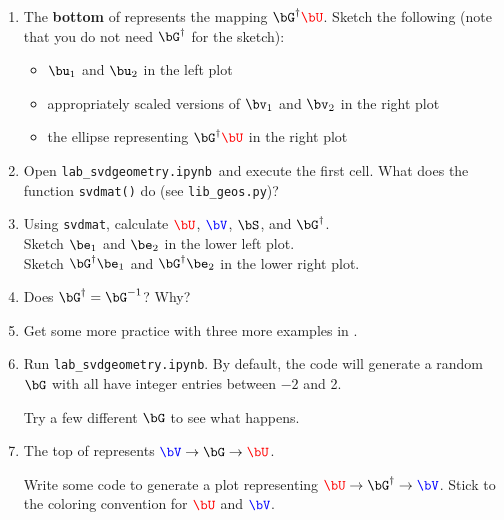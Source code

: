 \documentclass[11pt,titlepage,fleqn]{article}
\newcommand{\tfile}{{\tt lab\_svdgeometry.ipynb}}
\begin{document}
\begin{enumerate}

\item The {\bf bottom} of  represents the mapping $\bG^{\dagger}\Ucolor$. Sketch the following (note that you do not need $\bG^{\dagger}$ for the sketch):
%
\begin{itemize}
\item $\bu_1$ and $\bu_2$ in the left plot
\item appropriately scaled versions of $\bv_1$ and $\bv_2$ in the right plot
\item the ellipse representing $\bG^{\dagger}\Ucolor$ in the right plot
\end{itemize}

\item Open \tfile\ and execute the first cell. What does the function \verb+svdmat()+ do (see \verb+lib_geos.py+)?

\item Using \verb+svdmat+, calculate $\Ucolor$, $\Vcolor$, $\bS$, and $\bG^{\dagger}$. \\
Sketch $\be_1$ and $\be_2$ in the lower left plot. \\
Sketch $\bG^{\dagger}\be_1$ and $\bG^{\dagger}\be_2$ in the lower right plot.

\item Does $\bG^{\dagger} = \bG^{-1}$? Why?

\item Get some more practice with three more examples in .

\item Run \tfile. By default, the code will generate a random $\bG$ with all have integer entries between $-2$ and 2.

Try a few different $\bG$ to see what happens.

\item The top of  represents $\Vcolor \rightarrow \bG \rightarrow \Ucolor$.

Write some code to generate a plot representing $\Ucolor \rightarrow \bG^{\dagger} \rightarrow \Vcolor$. Stick to the coloring convention for $\Ucolor$ and $\Vcolor$.

\end{enumerate}


\end{document}
